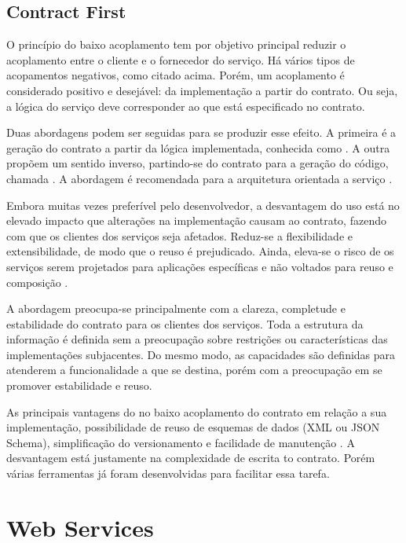 \subsection{Contract First}
\vspace{-6mm}

O princípio do baixo acoplamento tem por objetivo principal reduzir o
acoplamento entre o cliente e o fornecedor do serviço. Há vários tipos de
acopamentos negativos, como citado acima. Porém, um acoplamento é considerado
positivo e desejável: da implementação a partir do contrato. Ou seja, a lógica
do serviço deve corresponder ao que está especificado no contrato.

Duas abordagens podem ser seguidas para se produzir esse efeito. A primeira é a
geração do contrato a partir da lógica implementada, conhecida como
\CdFirst{}. A outra propõem um sentido inverso, partindo-se do contrato
para a geração do código, chamada \CtFirst{}. A abordagem
\CtFirst{} é recomendada para a arquitetura orientada a serviço
\cite{erl2009web}.

Embora muitas vezes preferível pelo desenvolvedor, a desvantagem do uso
\CdFirst{} está no elevado impacto que alterações na implementação causam ao
contrato, fazendo com que os clientes dos serviços seja afetados. Reduz-se a
flexibilidade e extensibilidade, de modo que o reuso é prejudicado. Ainda,
eleva-se o risco de os serviços serem projetados para aplicações específicas e
não voltados para reuso e composição \cite{karthikeyancontract}.

A abordagem \CtFirst{} preocupa-se principalmente com a clareza, completude e
estabilidade do contrato para os clientes dos serviços. Toda a
estrutura da informação é definida sem a preocupação sobre restrições ou
características das implementações subjacentes. Do mesmo modo, as
capacidades são definidas para atenderem a funcionalidade a que se destina,
porém com a preocupação em se promover estabilidade e reuso.

As principais vantagens do \CtFirst{} no baixo acoplamento do contrato em
relação a sua implementação, possibilidade de reuso de esquemas de dados (XML
ou JSON Schema), simplificação do versionamento e facilidade de manutenção
\cite{karthikeyancontract}. A desvantagem está justamente na complexidade de
escrita to contrato. Porém várias ferramentas já foram desenvolvidas para
facilitar essa tarefa.


\section{Web Services}
\vspace{-6mm}

